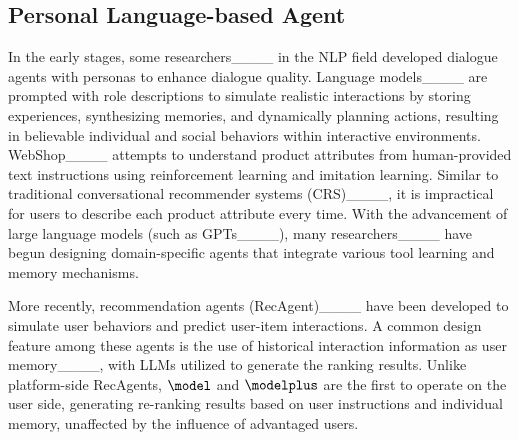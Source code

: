 \subsection{Personal Language-based Agent}
In the early stages, some researchers____ in the NLP field developed dialogue agents with personas to enhance dialogue quality. Language models____ are prompted with role descriptions to simulate realistic interactions by storing experiences, synthesizing memories, and dynamically planning actions, resulting in believable individual and social behaviors within interactive environments. 
WebShop____ attempts to understand product attributes from human-provided text instructions using reinforcement learning and imitation learning. Similar to traditional conversational recommender systems (CRS)____, it is impractical for users to describe each product attribute every time. With the advancement of large language models (such as GPTs____), many researchers____ have begun designing domain-specific agents that integrate various tool learning and memory mechanisms.

More recently, recommendation agents (RecAgent)____ have been developed to simulate user behaviors and predict user-item interactions. A common design feature among these agents is the use of historical interaction information as user memory____, with LLMs utilized to generate the ranking results. Unlike platform-side RecAgents, $\model$ and $\modelplus$ are the first to operate on the user side, generating re-ranking results based on user instructions and individual memory, unaffected by the influence of advantaged users.












% 
% 



\clearpage
\onecolumn